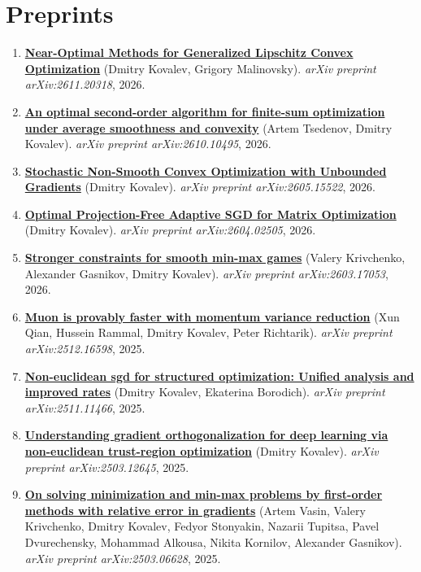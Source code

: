 \section{Preprints}
\begin{enumerate}
\item
\textbf{\href{https://arxiv.org/abs/2611.20318}{Near-Optimal Methods for Generalized Lipschitz Convex Optimization}} (Dmitry Kovalev, Grigory Malinovsky). \textit{arXiv preprint arXiv:2611.20318}, 2026.
\item
\textbf{\href{https://arxiv.org/abs/2610.10495}{An optimal second-order algorithm for finite-sum optimization under average smoothness and convexity}} (Artem Tsedenov, Dmitry Kovalev). \textit{arXiv preprint arXiv:2610.10495}, 2026.
\item
\textbf{\href{https://arxiv.org/abs/2605.15522}{Stochastic Non-Smooth Convex Optimization with Unbounded Gradients}} (Dmitry Kovalev). \textit{arXiv preprint arXiv:2605.15522}, 2026.
\item
\textbf{\href{https://arxiv.org/abs/2604.02505}{Optimal Projection-Free Adaptive SGD for Matrix Optimization}} (Dmitry Kovalev). \textit{arXiv preprint arXiv:2604.02505}, 2026.
\item
\textbf{\href{https://arxiv.org/abs/2603.17053}{Stronger constraints for smooth min-max games}} (Valery Krivchenko, Alexander Gasnikov, Dmitry Kovalev). \textit{arXiv preprint arXiv:2603.17053}, 2026.
\item
\textbf{\href{https://arxiv.org/abs/2512.16598}{Muon is provably faster with momentum variance reduction}} (Xun Qian, Hussein Rammal, Dmitry Kovalev, Peter Richtarik). \textit{arXiv preprint arXiv:2512.16598}, 2025.
\item
\textbf{\href{https://arxiv.org/abs/2511.11466}{Non-euclidean sgd for structured optimization: Unified analysis and improved rates}} (Dmitry Kovalev, Ekaterina Borodich). \textit{arXiv preprint arXiv:2511.11466}, 2025.
\item
\textbf{\href{https://arxiv.org/abs/2503.12645}{Understanding gradient orthogonalization for deep learning via non-euclidean trust-region optimization}} (Dmitry Kovalev). \textit{arXiv preprint arXiv:2503.12645}, 2025.
\item
\textbf{\href{https://arxiv.org/abs/2503.06628}{On solving minimization and min-max problems by first-order methods with relative error in gradients}} (Artem Vasin, Valery Krivchenko, Dmitry Kovalev, Fedyor Stonyakin, Nazarii Tupitsa, Pavel Dvurechensky, Mohammad Alkousa, Nikita Kornilov, Alexander Gasnikov). \textit{arXiv preprint arXiv:2503.06628}, 2025.

\end{enumerate}
